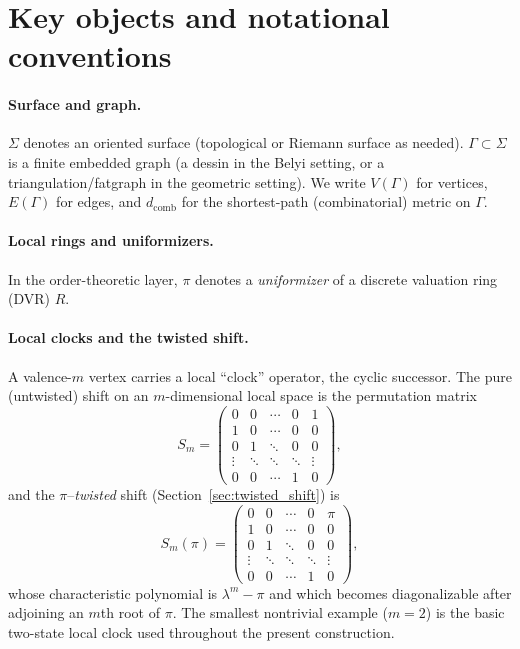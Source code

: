 \documentclass[11pt,oneside]{amsbook}
\numberwithin{equation}{section}
\theoremstyle{plain}
\theoremstyle{definition}
\theoremstyle{remark}
\begin{document}
\section*{Key objects and notational conventions}

\paragraph{Surface and graph.}
$\Sigma$ denotes an oriented surface (topological or Riemann surface as needed).
$\Gamma\subset\Sigma$ is a finite embedded graph (a dessin in the Belyi setting, or a triangulation/fatgraph in the geometric setting).
We write $V(\Gamma)$ for vertices, $E(\Gamma)$ for edges, and $d_{\mathrm{comb}}$ for the shortest-path (combinatorial) metric on $\Gamma$.

\paragraph{Local rings and uniformizers.}
In the order-theoretic layer, $\pi$ denotes a \emph{uniformizer} of a discrete valuation ring (DVR) $R$. 

\paragraph{Local clocks and the twisted shift.}
A valence-$m$ vertex carries a local ``clock'' operator, the cyclic successor.
The pure (untwisted) shift on an $m$-dimensional local space is the permutation matrix
\[
S_m=\begin{pmatrix}
0&0&\cdots&0&1\\
1&0&\cdots&0&0\\
0&1&\ddots&0&0\\
\vdots&\ddots&\ddots&\ddots&\vdots\\
0&0&\cdots&1&0
\end{pmatrix},
\]
and the $\pi$--\emph{twisted} shift (Section~\ref{sec:twisted_shift}) is
\[
S_m(\pi)=\begin{pmatrix}
0&0&\cdots&0&\pi\\
1&0&\cdots&0&0\\
0&1&\ddots&0&0\\
\vdots&\ddots&\ddots&\ddots&\vdots\\
0&0&\cdots&1&0
\end{pmatrix},
\]
whose characteristic polynomial is $\lambda^m-\pi$ and which becomes diagonalizable after adjoining an $m$th root of $\pi$.
The smallest nontrivial example ($m=2$) is the basic two-state local clock used throughout the present construction.
\end{document}
